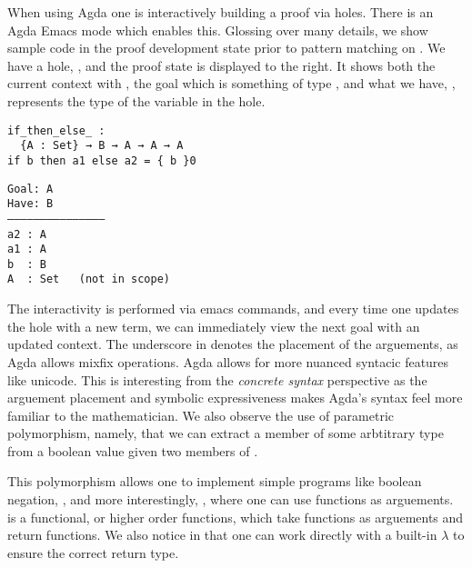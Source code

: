 When using Agda one is interactively building a proof via holes. There is an
Agda Emacs mode which enables this. Glossing over many details, we show sample
code in the proof development state prior to pattern matching on .
We have a hole, , and the proof state is displayed to the
right. It shows both the current context with , the goal
which is something of type , and what we have, ,
represents the type of the variable in the hole.

\hfill
\begin{minipage}[t]{.4\textwidth}
\begin{verbatim}
if_then_else_ :
  {A : Set} → B → A → A → A
if b then a1 else a2 = { b }0
\end{verbatim}
\end{minipage}
\hfill
\begin{minipage}[t]{.5\textwidth}
\begin{verbatim}
Goal: A
Have: B
———————————————
a2 : A
a1 : A
b  : B
A  : Set   (not in scope)
\end{verbatim}
\end{minipage}

The interactivity is performed via emacs commands, and every time one updates
the hole with a new term, we can immediately view the next goal with an updated
context. The underscore in  denotes the placement of the
arguements, as Agda allows mixfix operations. Agda allows for more nuanced
syntacic features like unicode. This is interesting from the \emph{concrete
syntax} perspective as the arguement placement and symbolic expressiveness makes
Agda's syntax feel more familiar to the mathematician. We also observe the use
of parametric polymorphism, namely, that we can extract a member of some
arbtitrary type  from a boolean value given two members of .

This polymorphism allows one to implement simple programs like boolean negation,
\term{~}, and more interestingly, , where one can use
functions as arguements.  is a functional, or higher
order functions, which take functions as arguements and return functions. We
also notice in  that one can work directly with a
built-in $\lambda$ to ensure the correct return type.

